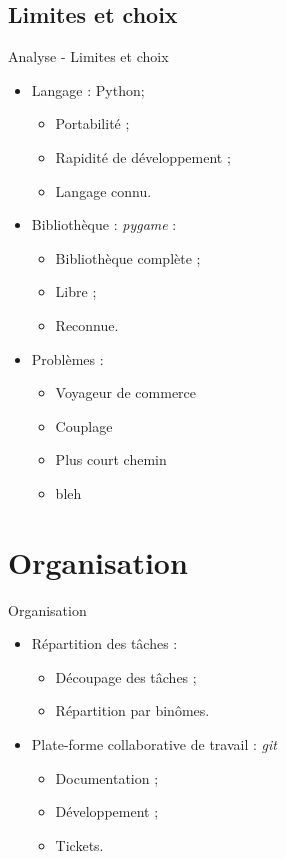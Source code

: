 \documentclass{beamer}
\begin{document}
	\subsection{Limites et choix}
		\begin{frame}{Analyse - Limites et choix}
			\begin{itemize}
				\setlength{\itemsep}{0.3cm}
				\item Langage : Python;
					\begin{itemize}
						\item Portabilité ;
						\item Rapidité de développement ;
						\item Langage connu.
					\end{itemize}
				\item Bibliothèque : \emph{pygame} :
					\begin{itemize}
						\item Bibliothèque complète ;
						\item Libre ;
						\item Reconnue.
					\end{itemize}
				\item Problèmes :
					\begin{itemize}
						\item Voyageur de commerce
						\item Couplage
						\item Plus court chemin
						\item bleh
					\end{itemize}
			\end{itemize}
		\end{frame}
\section{Organisation}
	\begin{frame}{Organisation}
		\begin{itemize}
			\setlength{\itemsep}{0.75cm}
			\item Répartition des tâches :
			\begin{itemize}
			\setlength{\itemsep}{0.3cm}
				\item Découpage des tâches ;
				\item Répartition par binômes.
			\end{itemize}
			\item Plate-forme collaborative de travail : \emph{git}
			\begin{itemize}
			\setlength{\itemsep}{0.3cm}
				\item Documentation ;
				\item Développement ;
				\item Tickets.
			\end{itemize}
		\end{itemize}
	\end{frame}
\end{document}
